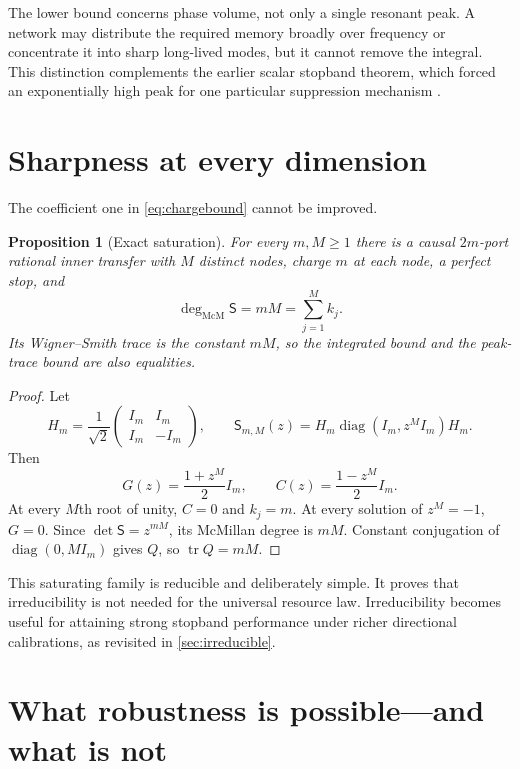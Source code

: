 \documentclass[11pt]{article}
\newtheorem{proposition}[theorem]{Proposition}
\theoremstyle{definition}
\theoremstyle{remark}
\newcommand{\diag}{\operatorname{diag}}
\newcommand{\tr}{\operatorname{tr}}
\newcommand{\mcdeg}{\deg_{\mathrm{McM}}}
\begin{document}
The lower bound concerns phase volume, not only a single resonant peak.  A
network may distribute the required memory broadly over frequency or
concentrate it into sharp long-lived modes, but it cannot remove the integral.
This distinction complements the earlier scalar stopband theorem, which
forced an exponentially high peak for one particular suppression mechanism
\cite{ErikssonReservoir2026}.

\section{Sharpness at every dimension}

The coefficient one in \eqref{eq:chargebound} cannot be improved.

\begin{proposition}[Exact saturation]
\label{prop:sharp}
For every $m,M\geq1$ there is a causal $2m$-port rational inner transfer with
$M$ distinct nodes, charge $m$ at each node, a perfect stop, and
\begin{equation}\label{eq:sharp}
 \mcdeg\mathsf S=mM=\sum_{j=1}^{M}k_j.
\end{equation}
Its Wigner--Smith trace is the constant $mM$, so the integrated bound and the
peak-trace bound are also equalities.
\end{proposition}

\begin{proof}
Let
\[
 H_m=\frac1{\sqrt2}\begin{pmatrix}I_m&I_m\\I_m&-I_m\end{pmatrix},
 \qquad
 \mathsf S_{m,M}(z)=H_m\diag(I_m,z^M I_m)H_m.
\]
Then
\begin{equation}\label{eq:sharpblocks}
 G(z)=\frac{1+z^M}{2}I_m,
 \qquad C(z)=\frac{1-z^M}{2}I_m.
\end{equation}
At every $M$th root of unity, $C=0$ and $k_j=m$.  At every solution of
$z^M=-1$, $G=0$.  Since $\det\mathsf S=z^{mM}$, its McMillan degree is $mM$.
Constant conjugation of $\diag(0,MI_m)$ gives $Q$, so $\tr Q=mM$.
\end{proof}

This saturating family is reducible and deliberately simple.  It proves that
irreducibility is not needed for the universal resource law.  Irreducibility
becomes useful for attaining strong stopband performance under richer
directional calibrations, as revisited in \cref{sec:irreducible}.

\section{What robustness is possible---and what is not}
\end{document}
